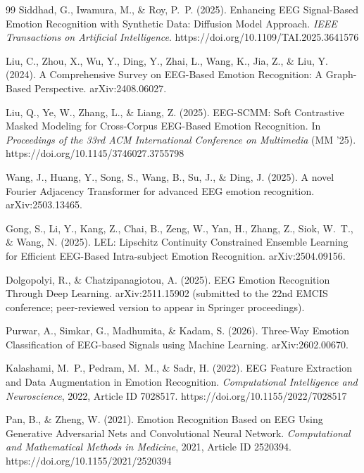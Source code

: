 \documentclass[11pt]{report}
\begin{document}
\begin{thebibliography}{99}
Siddhad, G., Iwamura, M., \& Roy, P.~P. (2025). Enhancing EEG Signal-Based
Emotion Recognition with Synthetic Data: Diffusion Model Approach.
\emph{IEEE Transactions on Artificial Intelligence}.
https://doi.org/10.1109/TAI.2025.3641576

Liu, C., Zhou, X., Wu, Y., Ding, Y., Zhai, L., Wang, K., Jia, Z., \& Liu, Y.
(2024). A Comprehensive Survey on EEG-Based Emotion Recognition: A
Graph-Based Perspective. arXiv:2408.06027.

Liu, Q., Ye, W., Zhang, L., \& Liang, Z. (2025). EEG-SCMM: Soft Contrastive
Masked Modeling for Cross-Corpus EEG-Based Emotion Recognition. In
\emph{Proceedings of the 33rd ACM International Conference on Multimedia}
(MM '25). https://doi.org/10.1145/3746027.3755798

Wang, J., Huang, Y., Song, S., Wang, B., Su, J., \& Ding, J. (2025). A
novel Fourier Adjacency Transformer for advanced EEG emotion recognition.
arXiv:2503.13465.

Gong, S., Li, Y., Kang, Z., Chai, B., Zeng, W., Yan, H., Zhang, Z., Siok,
W.~T., \& Wang, N. (2025). LEL: Lipschitz Continuity Constrained Ensemble
Learning for Efficient EEG-Based Intra-subject Emotion Recognition.
arXiv:2504.09156.

Dolgopolyi, R., \& Chatzipanagiotou, A. (2025). EEG Emotion Recognition
Through Deep Learning. arXiv:2511.15902 (submitted to the 22nd EMCIS
conference; peer-reviewed version to appear in Springer proceedings).

Purwar, A., Simkar, G., Madhumita, \& Kadam, S. (2026). Three-Way Emotion
Classification of EEG-based Signals using Machine Learning.
arXiv:2602.00670.

Kalashami, M.~P., Pedram, M.~M., \& Sadr, H. (2022). EEG Feature Extraction
and Data Augmentation in Emotion Recognition. \emph{Computational
Intelligence and Neuroscience}, 2022, Article ID 7028517.
https://doi.org/10.1155/2022/7028517

Pan, B., \& Zheng, W. (2021). Emotion Recognition Based on EEG Using
Generative Adversarial Nets and Convolutional Neural Network.
\emph{Computational and Mathematical Methods in Medicine}, 2021, Article ID
2520394. https://doi.org/10.1155/2021/2520394


\end{thebibliography}
\end{document}
